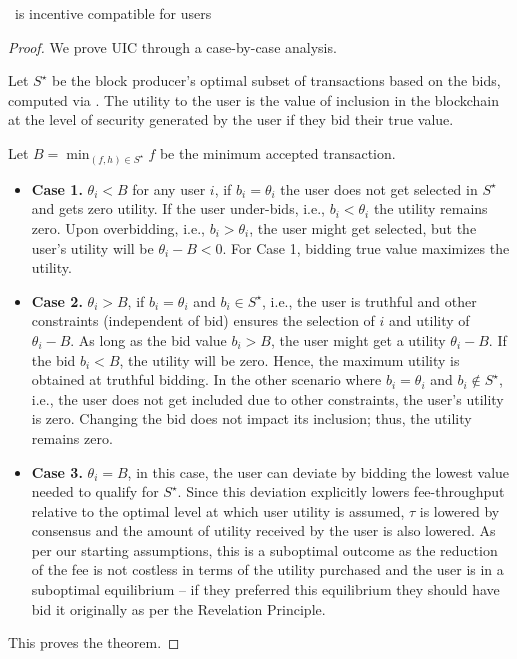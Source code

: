 \begin{theorem}\label{thm:UIC}
   \ourTFM\ is incentive compatible for users
\end{theorem}
\begin{proof}

    We prove UIC through a case-by-case analysis.

    Let $S^\star$ be the block producer's optimal subset of transactions based on the bids, computed via \ourOPT. The utility to the user is the value of inclusion in the blockchain at the level of security generated by the user if they bid their true value.

    Let $B = \min_{(f, h)\in S^\star} f$ be the minimum accepted transaction.

    \begin{itemize}[leftmargin=*]

        \item \textbf{Case 1.} $\theta_i < B$ for any user $i$, if $b_i = \theta_i$ the user does not get selected in $S^\star$ and gets zero utility. If the user under-bids, i.e., $b_i < \theta_i$ the utility remains zero. Upon overbidding, i.e., $b_i > \theta_i$, the user might get selected, but the user's utility will be $\theta_i - B < 0$. For Case 1, bidding true value maximizes the utility.

        \item \textbf{Case 2.} $\theta_i > B$, if $b_i = \theta_i$ and $b_i \in S^\star$, i.e., the user is truthful and other constraints (independent of bid) ensures the selection of $i$ and utility of $\theta_i - B$. As long as the bid value $b_i > B$, the user might get a utility $\theta_i - B$. If the bid $b_i < B$, the utility will be zero. Hence, the maximum utility is obtained at truthful bidding. In the other scenario where $b_i = \theta_i$ and $b_i \not\in S^\star$, i.e., the user does not get included due to other constraints, the user's utility is zero. Changing the bid does not impact its inclusion; thus, the utility remains zero.

        \item \textbf{Case 3.} $\theta_i = B$, in this case, the user can deviate by bidding the lowest value needed to qualify for $S^\star$. Since this deviation explicitly lowers fee-throughput relative to the optimal level at which user utility is assumed, $\tau$ is lowered by consensus and the amount of utility received by the user is also lowered. As per our starting assumptions, this is a suboptimal outcome as the reduction of the fee is not costless in terms of the utility purchased and the user is in a suboptimal equilibrium -- if they preferred this equilibrium they should have bid it originally as per the Revelation Principle.
    \end{itemize}
    This proves the theorem.
\end{proof}

